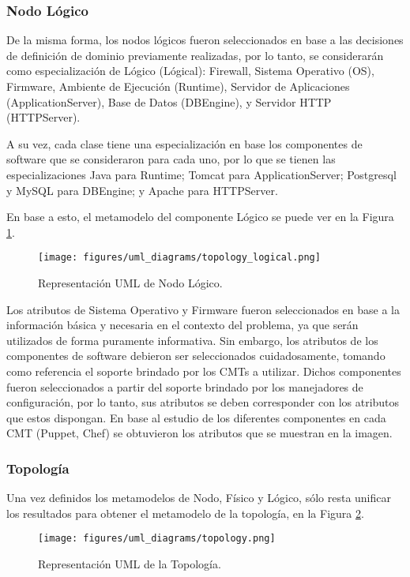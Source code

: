 \subsubsection{Nodo Lógico}
De la misma forma, los nodos lógicos fueron seleccionados en base a las decisiones de definición de dominio previamente realizadas, por lo tanto, se considerarán como especialización de Lógico (Lógical): Firewall, Sistema Operativo (OS), Firmware, Ambiente de Ejecución (Runtime), Servidor de Aplicaciones (ApplicationServer), Base de Datos (DBEngine), y Servidor HTTP (HTTPServer).

A su vez, cada clase tiene una especialización en base los componentes de software que se consideraron para cada uno, por lo que se tienen las especializaciones Java para Runtime; Tomcat para ApplicationServer; Postgresql y MySQL para DBEngine; y Apache para HTTPServer. 

En base a esto, el metamodelo del componente Lógico se puede ver en la Figura \ref{fig:uml:logical}.

\begin{figure}[htbp]
    \centering
    \texttt{[image: figures/uml\_diagrams/topology\_logical.png]}
    \caption{Representación UML de Nodo Lógico.}
    \label{fig:uml:logical}
\end{figure}

Los atributos de Sistema Operativo y Firmware fueron seleccionados en base a la información básica y necesaria en el contexto del problema, ya que serán utilizados de forma puramente informativa. 
Sin embargo, los atributos de los componentes de software debieron ser seleccionados cuidadosamente, tomando como referencia el soporte brindado por los CMTs a utilizar. Dichos componentes fueron seleccionados a partir del soporte brindado por los manejadores de configuración, por lo tanto, sus atributos se deben corresponder con los atributos que estos dispongan. 
En base al estudio de los diferentes componentes en cada CMT (Puppet, Chef) se obtuvieron los atributos que se muestran en la imagen.

\subsubsection{Topología}
Una vez definidos los metamodelos de Nodo, Físico y Lógico, sólo resta unificar los resultados para obtener el metamodelo de la topología, en la Figura \ref{fig:uml:topology}.

\begin{figure}[htbp]
    \centering
    \texttt{[image: figures/uml\_diagrams/topology.png]}
    \caption{Representación UML de la Topología.}
    \label{fig:uml:topology}
\end{figure}


